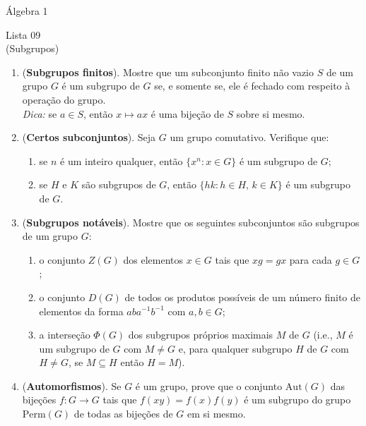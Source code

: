 \documentclass[a4paper,12pt]{article}
\begin{document}
\begin{center}
    \large Álgebra 1
\end{center}

\begin{center}
    \large Lista 09 \\
    \small (Subgrupos)
\end{center}
  
\begin{enumerate}[label=9.\arabic*.]

    \item (\textbf{Subgrupos finitos}). Mostre que um subconjunto finito não vazio $S$ de um grupo $G$ 
    é um subgrupo de $G$ se, e somente se, ele é fechado com respeito à operação do grupo. 
    \\ \textit{Dica:} se $a \in S$, então $x \mapsto ax$ é uma bijeção de $S$ sobre si mesmo. 

    \item (\textbf{Certos subconjuntos}). Seja $G$ um grupo comutativo. Verifique que: 
    \begin{enumerate}[label=(\roman*)]
        \item se $n$ é um inteiro qualquer, então $\{x^n : x \in G\}$ é um subgrupo de $G$;
        \item se $H$ e $K$ são subgrupos de $G$, então $\{hk : h \in H, \, k \in K\}$ é um subgrupo de $G$.
    \end{enumerate}

    \item (\textbf{Subgrupos notáveis}). Mostre que os seguintes subconjuntos são subgrupos de um grupo $G$:
    \begin{enumerate}[label=(\roman*)]
        \item o conjunto $Z(G)$ dos elementos $x \in G$ tais que $xg = gx$ para cada $g \in G$;
        \item o conjunto $D(G)$ de todos os produtos possíveis de um número finito de elementos da forma $aba^{-1}b^{-1}$ com $a, b \in G$;
        \item a interseção $\Phi(G)$ dos subgrupos próprios maximais $M$ de $G$ 
        (i.e., $M$ é um subgrupo de $G$ com $M \neq G$ e, para qualquer subgrupo $H$ de $G$ com $H \neq G$, se $M \subseteq H$ então $H = M$).
    \end{enumerate}

    \item (\textbf{Automorfismos}). Se $G$ é um grupo, prove que o conjunto $\text{Aut}(G)$ das bijeções $f : G \to G$ tais que $f(xy) = f(x)f(y)$ é um subgrupo do grupo $\text{Perm}(G)$ de todas as bijeções de $G$ em si mesmo. 


\end{enumerate}
\end{document}
